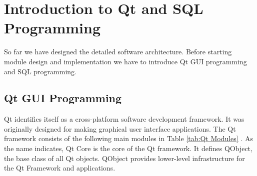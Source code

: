 \chapter{Introduction to Qt and SQL Programming\label{ch:Introduction to Qt and SQL Programming}}
So far we have designed the detailed software architecture. Before starting module design and implementation we have to introduce Qt GUI programming and SQL programming.

\section{Qt GUI Programming}
Qt \cite{qt} identifies itself as a cross-platform software development framework. It was originally designed for making graphical user interface applications. The Qt framework consists of the following main modules in Table \ref{tab:Qt Modules} \cite{qtmodules}. As the name indicates, Qt Core is the core of the Qt framework. It defines QObject, the base class of all Qt objects. QObject provides lower-level infrastructure for the Qt Framework and applications.


